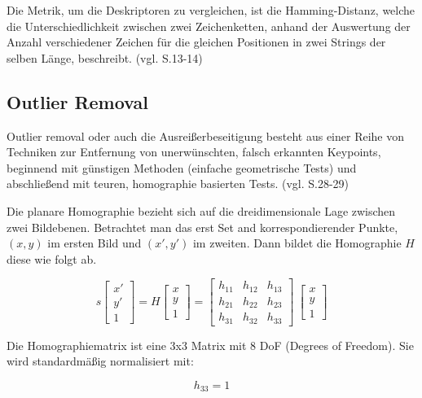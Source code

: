 Die Metrik, um die Deskriptoren zu vergleichen, ist die Hamming-Distanz, welche die Unterschiedlichkeit zwischen zwei Zeichenketten, anhand der Auswertung der Anzahl verschiedener Zeichen für die gleichen Positionen in zwei Strings der selben Länge, beschreibt. (vgl. \cite{orb_slam} S.13-14)


\subsection{Outlier Removal}

\glqq Outlier removal\grqq{} oder auch die Ausreißerbeseitigung besteht aus einer Reihe von Techniken zur Entfernung von unerwünschten, falsch erkannten Keypoints, beginnend mit günstigen Methoden (einfache geometrische Tests) und abschließend mit teuren, homographie basierten Tests. (vgl. \cite{natural_feature} S.28-29) 


Die planare Homographie bezieht sich auf die dreidimensionale Lage zwischen zwei Bildebenen. Betrachtet man das erst Set and korrespondierender Punkte, $(x,y)$ im ersten Bild und $(x',y')$ im zweiten. Dann bildet die Homographie $H$ diese wie folgt ab.

\begin{equation}
  s  
  		\begin{bmatrix}
		x'\\
		y'\\
		1
     	\end{bmatrix}
     = H
     	\begin{bmatrix}
		x\\
		y\\
		1
     	\end{bmatrix}
      = 
     	\begin{bmatrix}
		h_{11} & h_{12} & h_{13}\\
		h_{21} & h_{22} & h_{23}\\
		h_{31} & h_{32} & h_{33}
     	\end{bmatrix}
      \
     	\begin{bmatrix}
		x\\
		y\\
		1
     	\end{bmatrix}
\end{equation}

Die Homographiematrix ist eine 3x3 Matrix mit 8 DoF (Degrees of Freedom). Sie wird standardmäßig normalisiert mit: 

\begin{equation}
h_33 = 1
\end{equation}

